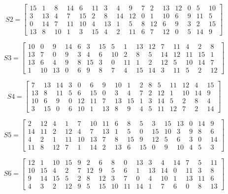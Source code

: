 $$
S2 =
\begin{bmatrix}
15 & 1 & 8 & 14 & 6 & 11 & 3 & 4 & 9 & 7 & 2 & 13 & 12 & 0 & 5 & 10 \\
3  & 13 & 4 & 7  & 15 & 2  & 8 & 14 & 12 & 0 & 1 & 10 & 6 & 9 & 11 & 5 \\
0  & 14 & 7 & 11 & 10 & 4  & 13 & 1 & 5  & 8 & 12 & 6  & 9 & 3 & 2  & 15 \\
13 & 8  & 10 & 1 & 3  & 15 & 4 & 2 & 11 & 6 & 7 & 12 & 0 & 5 & 14 & 9
\end{bmatrix}
$$

$$
S3 =
\begin{bmatrix}
10 & 0 & 9 & 14 & 6 & 3 & 15 & 5 & 1 & 13 & 12 & 7 & 11 & 4 & 2 & 8 \\
13 & 7 & 0 & 9  & 3 & 4 & 6  & 10 & 2 & 8  & 5  & 14 & 12 & 11 & 15 & 1 \\
13 & 6 & 4 & 9  & 8 & 15 & 3 & 0 & 11 & 1  & 2  & 12 & 5 & 10 & 14 & 7 \\
1  & 10 & 13 & 0 & 6 & 9  & 8 & 7 & 4  & 15 & 14 & 3  & 11 & 5 & 2  & 12
\end{bmatrix}
$$

$$
S4 =
\begin{bmatrix}
7 & 13 & 14 & 3 & 0 & 6 & 9 & 10 & 1 & 2 & 8 & 5 & 11 & 12 & 4 & 15 \\
13 & 8 & 11 & 5 & 6 & 15 & 0 & 3 & 4 & 7 & 2 & 12 & 1 & 10 & 14 & 9 \\
10 & 6 & 9 & 0 & 12 & 11 & 7 & 13 & 15 & 1 & 3 & 14 & 5 & 2 & 8 & 4 \\
3 & 15 & 0 & 6 & 10 & 1 & 13 & 8 & 9 & 4 & 5 & 11 & 12 & 7 & 2 & 14
\end{bmatrix}
$$

$$
S5 =
\begin{bmatrix}
2 & 12 & 4 & 1 & 7 & 10 & 11 & 6 & 8 & 5 & 3 & 15 & 13 & 0 & 14 & 9 \\
14 & 11 & 2 & 12 & 4 & 7 & 13 & 1 & 5 & 0 & 15 & 10 & 3 & 9 & 8 & 6 \\
4 & 2 & 1 & 11 & 10 & 13 & 7 & 8 & 15 & 9 & 12 & 5 & 6 & 3 & 0 & 14 \\
11 & 8 & 12 & 7 & 1 & 14 & 2 & 13 & 6 & 15 & 0 & 9 & 10 & 4 & 5 & 3
\end{bmatrix}
$$

$$
S6 =
\begin{bmatrix}
12 & 1 & 10 & 15 & 9 & 2 & 6 & 8 & 0 & 13 & 3 & 4 & 14 & 7 & 5 & 11 \\
10 & 15 & 4 & 2 & 7 & 12 & 9 & 5 & 6 & 1 & 13 & 14 & 0 & 11 & 3 & 8 \\
9 & 14 & 15 & 5 & 2 & 8 & 12 & 3 & 7 & 0 & 4 & 10 & 1 & 13 & 11 & 6 \\
4 & 3 & 2 & 12 & 9 & 5 & 15 & 10 & 11 & 14 & 1 & 7 & 6 & 0 & 8 & 13
\end{bmatrix}
$$

